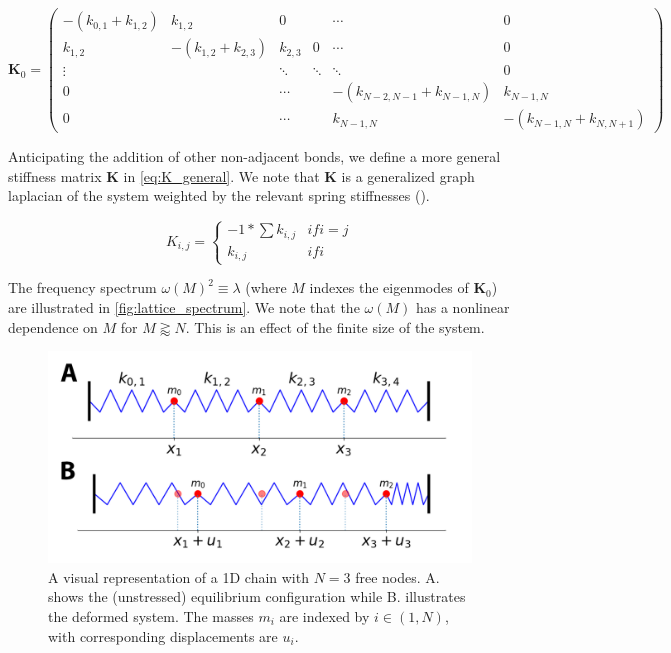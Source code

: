 \documentclass{article}
\begin{document}
\begin{equation}\label{eq:k_lattice}
		\bm{K}_0 = 
\begin{pmatrix}
	-(k_{0,1} + k_{1,2}) & k_{1,2} & 0 & &\cdots & 0 \\
	k_{1,2} & -(k_{1,2} + k_{2,3}) & k_{2,3} & 0 & \cdots & 0 \\
	\vdots & &\ddots& \ddots  & \ddots & 0\\
	0& & \cdots && -(k_{N-2, N-1} + k_{N-1, N}) & k_{N-1, N}\\
	0 & & \cdots & & k_{N-1, N}& -(k_{N-1, N} + k_{N, N+1})
\end{pmatrix} 
\end{equation}

Anticipating the addition of other non-adjacent bonds, we define a more general stiffness matrix $\bm{K}$ in \ref{eq:K_general}. 
We note that $\bm{K}$ is a generalized graph laplacian of the system weighted by the relevant spring stiffnesses (\cite{Chung1997-dc}).

\begin{equation}\label{eq:K_general}
	K_{i,j}= \begin{cases}
		-1 * \sum k_{i,j} & if i=j \\
		k_{i,j} & if i
	\end{cases}
\end{equation}

The frequency spectrum $\omega(M)^2 \equiv \lambda$ (where $M$ indexes the eigenmodes of $\bm{K}_0$) are illustrated in \ref{fig:lattice_spectrum}. 
We note that the $\omega(M)$ has a nonlinear dependence on $M$ for $M\gtrapprox N$.
This is an effect of the finite size of the system.

\begin{figure}
\begin{center}
	\includegraphics[width=.7\textwidth]{Figures/array.png}
\end{center}
\caption{A visual representation of a 1D chain with $N=3$ free nodes. 
	A. shows the (unstressed) equilibrium configuration while B. illustrates the deformed system.
The masses $m_i$ are indexed by $i \in (1, N)$, with corresponding displacements are $u_i$.}
\label{fig:1D_chain}
\end{figure}
\end{document}
